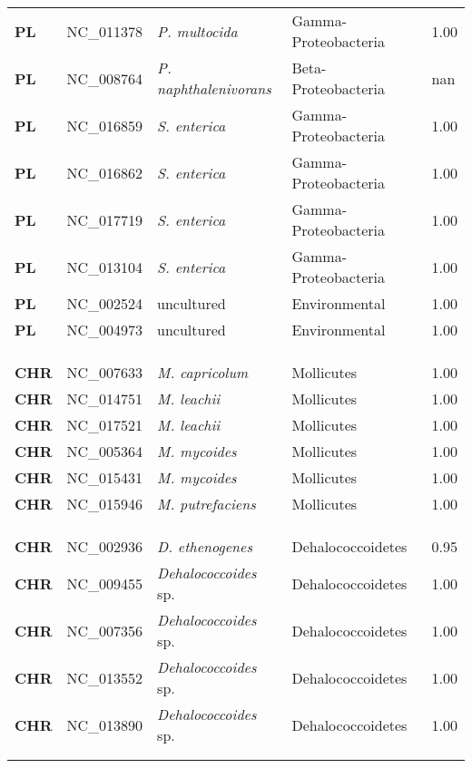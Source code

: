 \begin{adjustwidth}{-3cm}{2cm}
{\begin{supertabular}{>{\bfseries}l|p{0.1\textwidth}p{0.14\textwidth}l|l}
PL & NC\_011378 & \textit{P. multocida} & Gamma-Proteobacteria & 1.00\\
PL & NC\_008764 & \textit{P. naphthalenivorans} & Beta-Proteobacteria & nan\\
PL & NC\_016859 & \textit{S. enterica} & Gamma-Proteobacteria & 1.00\\
PL & NC\_016862 & \textit{S. enterica} & Gamma-Proteobacteria & 1.00\\
PL & NC\_017719 & \textit{S. enterica} & Gamma-Proteobacteria & 1.00\\
PL & NC\_013104 & \textit{S. enterica} & Gamma-Proteobacteria & 1.00\\
PL & NC\_002524 & uncultured & Environmental & 1.00\\
PL & NC\_004973 & uncultured & Environmental & 1.00\\
\\
\\
\hline\\
CHR & NC\_007633 & \textit{M. capricolum} & Mollicutes & 1.00\\
CHR & NC\_014751 & \textit{M. leachii} & Mollicutes & 1.00\\
CHR & NC\_017521 & \textit{M. leachii} & Mollicutes & 1.00\\
CHR & NC\_005364 & \textit{M. mycoides} & Mollicutes & 1.00\\
CHR & NC\_015431 & \textit{M. mycoides} & Mollicutes & 1.00\\
CHR & NC\_015946 & \textit{M. putrefaciens} & Mollicutes & 1.00\\
\\
\\
\hline\\
CHR & NC\_002936 &  \textit{D. ethenogenes}  & Dehalococcoidetes & 0.95\\
CHR & NC\_009455 &  \textit{Dehalococcoides}  sp. & Dehalococcoidetes & 1.00\\
CHR & NC\_007356 &  \textit{Dehalococcoides}  sp. & Dehalococcoidetes & 1.00\\
CHR & NC\_013552 &  \textit{Dehalococcoides}  sp. & Dehalococcoidetes & 1.00\\
CHR & NC\_013890 &  \textit{Dehalococcoides}  sp. & Dehalococcoidetes & 1.00\\
\\
\\

\end{supertabular}}
\end{adjustwidth}
